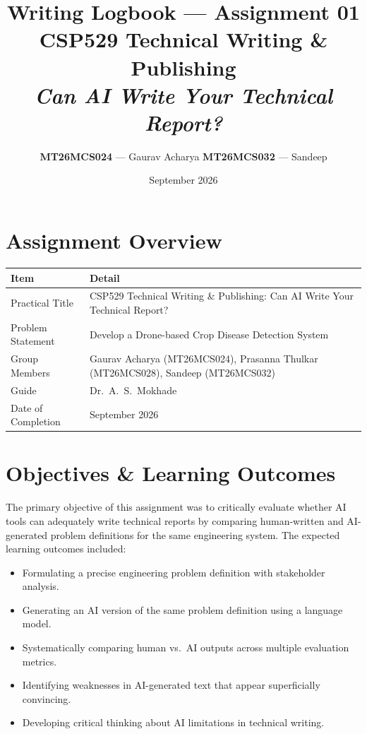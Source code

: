 \documentclass[11pt, a4paper]{article}
\title{
    \vspace{-1cm}
    \textbf{Writing Logbook --- Assignment 01} \\[0.3em]
    \large CSP529 Technical Writing \& Publishing \\[0.2em]
    \large \textit{Can AI Write Your Technical Report?}
}
\author{
    \textbf{MT26MCS024} --- Gaurav Acharya \quad
    \textbf{MT26MCS032} --- Sandeep
}
\date{September 2026}
\begin{document}
\maketitle
\thispagestyle{fancy}

\section{Assignment Overview}

\begin{tabular}{@{}p{4.5cm} p{10cm}@{}}
    \toprule
    \textbf{Item} & \textbf{Detail} \\
    \midrule
    Practical Title & CSP529 Technical Writing \& Publishing: Can AI Write Your Technical Report? \\
    Problem Statement & Develop a Drone-based Crop Disease Detection System \\
    Group Members & Gaurav Acharya (MT26MCS024), Prasanna Thulkar (MT26MCS028), Sandeep (MT26MCS032) \\
    Guide & Dr.\ A.\ S.\ Mokhade \\
    Date of Completion & September 2026 \\
    \bottomrule
\end{tabular}

\section{Objectives \& Learning Outcomes}

The primary objective of this assignment was to critically evaluate whether AI tools can adequately write technical reports by comparing human-written and AI-generated problem definitions for the same engineering system. The expected learning outcomes included:

\begin{itemize}[nosep]
    \item Formulating a precise engineering problem definition with stakeholder analysis.
    \item Generating an AI version of the same problem definition using a language model.
    \item Systematically comparing human vs.\ AI outputs across multiple evaluation metrics.
    \item Identifying weaknesses in AI-generated text that appear superficially convincing.
    \item Developing critical thinking about AI limitations in technical writing.
\end{itemize}
\end{document}
